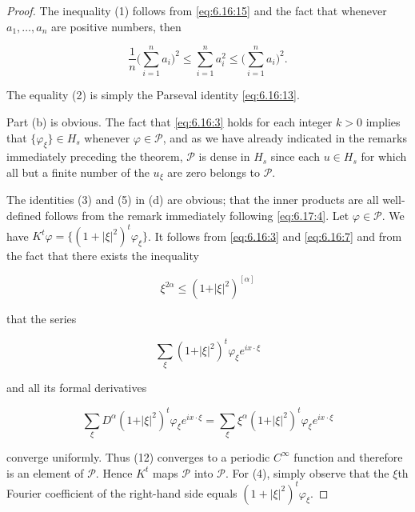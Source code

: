 \begin{proof}
The inequality (1) follows from \eqref{eq:6.16:15} and the fact that whenever $a_{1},\ldots,a_{n}$ are positive numbers, then

\begin{equation}
\tag{10}\label{eq:6.18:10}
\frac{1}{n}\Big(\sum_{i=1}^{n}a_{i}\Big)^{2}\leq\sum_{i=1}^{n}a_{i}^{2}\leq\Big(\sum_{i=1}^{n}a_{i}\Big)^{2}.
\end{equation}

The equality (2) is simply the Parseval identity \eqref{eq:6.16:13}.

Part (b) is obvious. The fact that \eqref{eq:6.16:3} holds for each integer $k > 0$ implies that $\{\varphi_{\xi}\} \in H_s$ whenever $\varphi \in \mathcal{P}$, and as we have already indicated in the remarks immediately preceding the theorem, $\mathcal{P}$ is dense in $H_s$ since each $u \in H_s$ for which all but a finite number of the $u_\xi$ are zero belongs to $\mathcal{P}$.

The identities (3) and (5) in (d) are obvious; that the inner products are all well-defined follows from the remark immediately following \eqref{eq:6.17:4}. Let $\varphi \in \mathcal{P}$. We have $K^t\varphi = \{(1 + |\xi|^2)^t\varphi_\xi\}$. It follows from \eqref{eq:6.16:3} and \eqref{eq:6.16:7} and from the fact that there exists the inequality

\begin{equation}
\tag{11}\label{eq:6.18:11}
\xi^{2\alpha}\leq(1+\vert\xi\vert^{2})^{[\alpha]}
\end{equation}

that the series

\begin{equation}
\tag{12}\label{eq:6.18:12}
\sum_{\xi}(1+\vert\xi\vert^{2})^{t}\varphi_{\xi}e^{i x\cdot\xi}
\end{equation}

and all its formal derivatives

\begin{equation}
\tag{13}\label{eq:6.18:13}
\sum_{\xi}D^{\alpha}(1+\vert\xi\vert^{2})^{t}\varphi_{\xi}e^{i x\cdot\xi}=\sum_{\xi}\xi^{\alpha}(1+\vert\xi\vert^{2})^{t}\varphi_{\xi}e^{i x\cdot\xi}
\end{equation}

converge uniformly. Thus (12) converges to a periodic $C^\infty$ function and therefore is an element of $\mathcal{P}$. Hence $K^t$ maps $\mathcal{P}$ into $\mathcal{P}$. For (4), simply observe that the $\xi$th Fourier coefficient of the right-hand side equals $(1 + |\xi|^2)^t \varphi_\xi$.


\end{proof}
